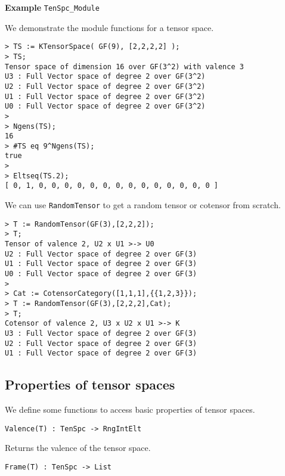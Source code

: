 \begin{framed}{\bf Example} {\tt TenSpc\_Module}\\
{\small We demonstrate the module functions for a tensor space.
\begin{lstlisting}[frame=single,basicstyle=\ttfamily\color{black!30!
teal},backgroundcolor=\color{white!70!gray}]
> TS := KTensorSpace( GF(9), [2,2,2,2] );
> TS;
Tensor space of dimension 16 over GF(3^2) with valence 3
U3 : Full Vector space of degree 2 over GF(3^2)
U2 : Full Vector space of degree 2 over GF(3^2)
U1 : Full Vector space of degree 2 over GF(3^2)
U0 : Full Vector space of degree 2 over GF(3^2)
> 
> Ngens(TS);
16
> #TS eq 9^Ngens(TS);
true
> 
> Eltseq(TS.2);
[ 0, 1, 0, 0, 0, 0, 0, 0, 0, 0, 0, 0, 0, 0, 0, 0 ]
\end{lstlisting}
We can use {\tt RandomTensor} to get a random tensor or cotensor from scratch.
\begin{lstlisting}[frame=single,basicstyle=\ttfamily\color{black!30!
teal},backgroundcolor=\color{white!70!gray}]
> T := RandomTensor(GF(3),[2,2,2]);
> T;
Tensor of valence 2, U2 x U1 >-> U0
U2 : Full Vector space of degree 2 over GF(3)
U1 : Full Vector space of degree 2 over GF(3)
U0 : Full Vector space of degree 2 over GF(3)
> 
> Cat := CotensorCategory([1,1,1],{{1,2,3}});
> T := RandomTensor(GF(3),[2,2,2],Cat);
> T;
Cotensor of valence 2, U3 x U2 x U1 >-> K
U3 : Full Vector space of degree 2 over GF(3)
U2 : Full Vector space of degree 2 over GF(3)
U1 : Full Vector space of degree 2 over GF(3)
\end{lstlisting}
}
\end{framed}

\subsection{Properties of tensor spaces}

We define some functions to access basic properties of tensor spaces.

\color{blue}
{\small \begin{verbatim}
Valence(T) : TenSpc -> RngIntElt
\end{verbatim} }
\color{black}

Returns the valence of the tensor space.

\color{blue}
{\small \begin{verbatim}
Frame(T) : TenSpc -> List
\end{verbatim} }
\color{black}

